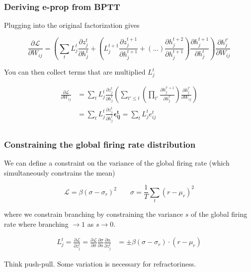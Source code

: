 \documentclass{beamer}
\begin{document}
\begin{frame}[plain]
\frametitle{Deriving e-prop from BPTT} 

Plugging into the original factorization gives

\begin{equation*}
\frac{\partial\mathcal{L}}{\partial W_{ij}} = \left(\sum_{t}L_{j}^{t} \frac{\partial z^{t}_{j}}{\partial h^{t}_{j}}  +  \left(L_{j}^{t+1} \frac{\partial z^{t+1}_{j}}{\partial h^{t+1}_{j}}  + (...) \frac{\partial h^{t+2}_{j}}{\partial h^{t+1}_{j}} \right) \frac{\partial h^{t+1}_{j}}{\partial h^{t}_{j}} \right)\frac{\partial h^{t'}_{j}}{{\partial W_{ij}}} 
\end{equation*}

You can then collect terms that are multiplied $L_{j}^{t}$

\begin{align*}
\frac{\partial\mathcal{L}}{\partial W_{ij}} &= \sum_{t}L_{j}^{t}\frac{\partial z^{t}_{j}}{\partial h^{t}_{j}} \left( \sum_{t'\leq t} \left(\prod_{t'} \frac{\partial h^{t'+1}_{j}}{\partial h^{t'}_{j}} \right)\frac{\partial h^{t'}_{j}}{{\partial W_{ij}}} \right) \\
&= \sum_{t}L_{j}^{t} \frac{\partial z^{t}_{j}}{\partial h^{t}_{j}}\mathbf{\epsilon_{ij}^{t}} = \sum_{t}L_{j}^{t} e_{ij}^{t} \\
\end{align*}

\end{frame}
\begin{frame}[plain]
\frametitle{Constraining the global firing rate distribution} 

We can define a constraint on the variance of the global firing rate (which simultaneously constrains the mean)

\begin{equation*}
\mathcal{L} = \beta(\sigma- \sigma_{r})^{2}
\;\;\;\;\;\;\; \sigma = \frac{1}{T}\sum_{t} (r - \mu_{r})^{2}
\end{equation*}

where we constrain branching by constraining the variance $s$ of the global firing rate where branching $\rightarrow 1$ as $s \rightarrow 0$.  

\begin{align*}
L_{j}^{t} = \frac{\partial \mathcal{L}}{\partial z_{j}^{t}} = \frac{\partial \mathcal{L}}{\partial \sigma}\frac{\partial \sigma}{\partial n} \frac{\partial n}{\partial z_{j}^{t}}
&= \pm \beta (\sigma- \sigma_{r}) \cdot (r-\mu_{r}) 
\end{align*}

Think push-pull. Some variation is necessary for refractoriness.

\end{frame}
\end{document}
